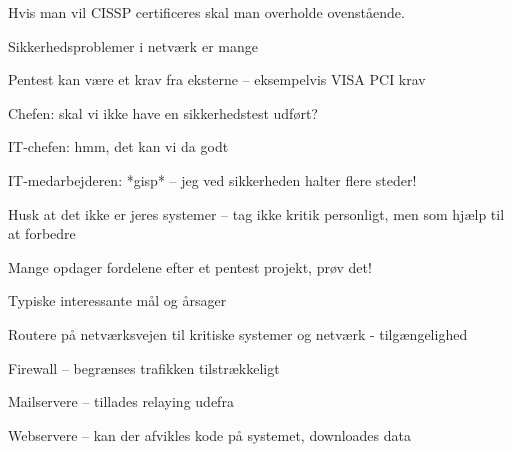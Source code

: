 \documentclass[20pt,landscape,a4paper,footrule]{foils}
\begin{document}
Hvis man vil CISSP certificeres skal man overholde ovenstående.\\



\begin{list1}
\item Sikkerhedsproblemer i netværk er mange
\item Pentest kan være et krav fra eksterne -- eksempelvis VISA PCI krav
\end{list1}

\begin{list2}
\item Chefen: skal vi ikke have en sikkerhedstest udført?
\item IT-chefen: hmm, det kan vi da godt
\item IT-medarbejderen: *gisp* -- jeg ved sikkerheden halter flere steder!
\item Husk at det ikke er jeres systemer -- tag ikke kritik personligt,
men som hjælp til at forbedre
\end{list2}

\vskip 2cm
\centerline{Mange opdager fordelene efter et pentest projekt, prøv det!}




\begin{list1}
\item Typiske interessante mål og årsager
\begin{list2}
\item Routere på netværksvejen til kritiske systemer og netværk -
  tilgængelighed
\item Firewall -- begrænses trafikken tilstrækkeligt
\item Mailservere -- tillades relaying udefra
\item Webservere -- kan der afvikles kode på systemet, downloades data
\end{list2}
\end{list1}


\end{document}
